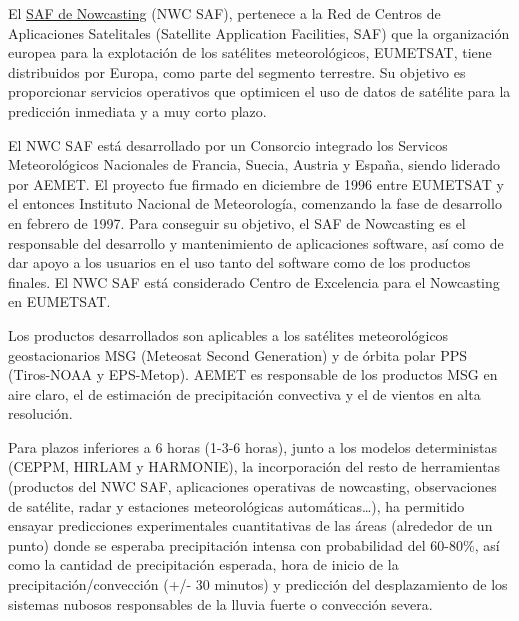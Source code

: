 \documentclass[11pt]{article}
\begin{document}
El \href{http://www.nwcsaf.org/HD/MainNS.jsp}{SAF de Nowcasting} (NWC SAF), pertenece a la Red de Centros de
Aplicaciones Satelitales (Satellite Application Facilities, SAF)
que la organización europea para la explotación de los satélites
meteorológicos, EUMETSAT, tiene distribuidos por Europa, como
parte del segmento terrestre. Su objetivo es proporcionar
servicios operativos que optimicen el uso de datos de satélite
para la predicción inmediata y a muy corto plazo.

El NWC SAF está desarrollado por un Consorcio integrado los
Servicos Meteorológicos Nacionales de Francia, Suecia, Austria y
España, siendo liderado por AEMET.  El proyecto fue firmado en
diciembre de 1996 entre EUMETSAT y el entonces Instituto Nacional
de Meteorología, comenzando la fase de desarrollo en febrero
de 1997. Para conseguir su objetivo, el SAF de Nowcasting es el
responsable del desarrollo y mantenimiento de aplicaciones
software, así como de dar apoyo a los usuarios en el uso tanto del
software como de los productos finales. El NWC SAF está
considerado Centro de Excelencia para el Nowcasting en EUMETSAT.

Los productos desarrollados son aplicables a los satélites
meteorológicos geostacionarios MSG (Meteosat Second Generation) y
de órbita polar PPS (Tiros-NOAA y EPS-Metop). AEMET es responsable
de los productos MSG en aire claro, el de estimación de
precipitación convectiva y el de vientos en alta resolución.

Para plazos inferiores a 6 horas (1-3-6 horas), junto a los
modelos deterministas (CEPPM, HIRLAM y HARMONIE), la incorporación
del resto de herramientas (productos del NWC SAF, aplicaciones
operativas de nowcasting, observaciones de satélite, radar y
estaciones meteorológicas automáticas…), ha permitido ensayar
predicciones experimentales cuantitativas de las áreas (alrededor
de un punto) donde se esperaba precipitación intensa con
probabilidad del 60-80\%, así como la cantidad de precipitación
esperada, hora de inicio de la precipitación/convección (+/- 30
minutos) y predicción del desplazamiento de los sistemas nubosos
responsables de la lluvia fuerte o convección severa.
\end{document}
